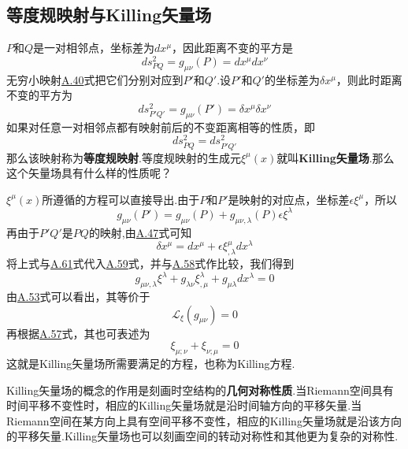 \documentclass[a4paper]{book}
\begin{document}
\begin{appendix}
\section{等度规映射与Killing矢量场}
$P$和$Q$是一对相邻点，坐标差为$dx^\mu$，因此距离不变的平方是
\begin{equation}\label{A.58}
	ds_{PQ}^2=g_{\mu\nu}(P)=dx^\mu dx^\nu
\end{equation}
无穷小映射\hyperref[A.40]{A.40}式把它们分别对应到$P'$和$Q'$.设$P'$和$Q'$的坐标差为$\delta x^\mu$，则此时距离不变的平方为
\begin{equation}\label{A.59}
	ds_{P'Q'}^2=g_{\mu\nu}(P')=\delta x^\mu \delta x^\nu
\end{equation}
如果对任意一对相邻点都有映射前后的不变距离相等的性质，即
\begin{equation}\label{A.60}
	ds_{PQ}^2=	ds_{P'Q'}^2
\end{equation}
那么该映射称为\textbf{等度规映射}.等度规映射的生成元$\xi^\mu(x)$就叫\textbf{Killing矢量场}.那么这个矢量场具有什么样的性质呢？\par 
$\xi^\mu(x)$所遵循的方程可以直接导出.由于$P$和$P'$是映射的对应点，坐标差$\epsilon \xi^\mu$，所以
\begin{equation}\label{A.61}
	g_{\mu\nu}(P')=g_{\mu\nu}(P)+g_{\mu\nu,\lambda}(P)\epsilon\xi^\lambda
\end{equation}
再由于$P'Q'$是$PQ$的映射,由\hyperref[A.47]{A.47}式可知
\begin{equation}\label{A.62}
	\delta x^\mu=dx^\mu+\epsilon\xi^\mu_{,\lambda}dx^\lambda
\end{equation}
将上式与\hyperref[A.61]{A.61}式代入\hyperref[A.59]{A.59}式，并与\hyperref[A.58]{A.58}式作比较，我们得到
\begin{equation}
	g_{\mu\nu,\lambda}\xi^\lambda+g_{\lambda\nu}\xi^\lambda_{,\mu}+g_{\mu\lambda}dx^\lambda=0
\end{equation}
由\hyperref[A.53]{A.53}式可以看出，其等价于
\begin{equation}
		\mathcal{L_{\xi}}(g_{\mu\nu})=0
\end{equation}
再根据\hyperref[A,57]{A.57}式，其也可表述为
\begin{equation}
	\xi_{\mu;\nu}+\xi_{\nu;\mu}=0
\end{equation}
这就是Killing矢量场所需要满足的方程，也称为Killing方程.\par 
Killing矢量场的概念的作用是刻画时空结构的\textbf{几何对称性质}.当Riemann空间具有时间平移不变性时，相应的Killing矢量场就是沿时间轴方向的平移矢量.当Riemann空间在某方向上具有空间平移不变性，相应的Killing矢量场就是沿该方向的平移矢量.Killing矢量场也可以刻画空间的转动对称性和其他更为复杂的对称性.

\end{appendix}
\end{document}
